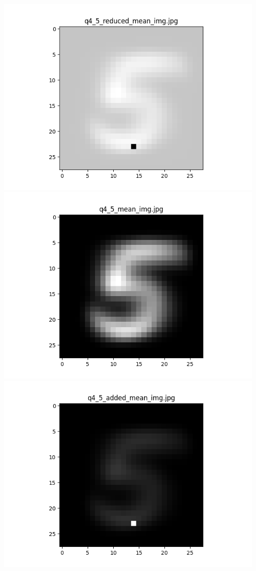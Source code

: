 \documentclass{article}
\begin{document}
    \\
    \includegraphics[scale=.37]{../results/q4/reduced_mean_images/q4_5_reduced_mean_img.png}
    \includegraphics[scale=.37]{../results/q4/mean_images/q4_5_mean_img.png}
    \includegraphics[scale=.37]{../results/q4/added_mean_images/q4_5_added_mean_img.png}
\end{document}
